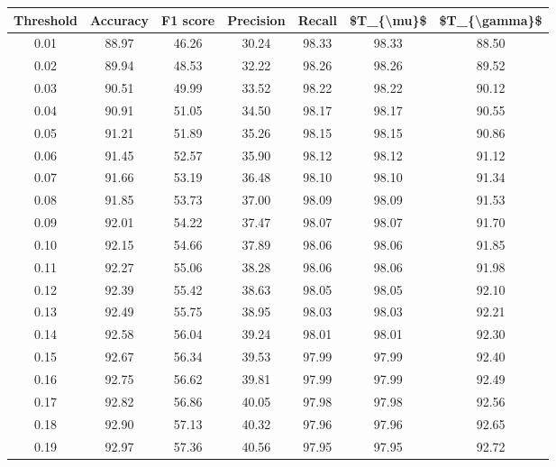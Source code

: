\begin{tabular}{|c|c|c|c|c|c|c|}
\hline
 Threshold &  Accuracy &  F1 score &  Precision &  Recall &  \$T\_\{\textbackslash mu\}\$ &  \$T\_\{\textbackslash gamma\}\$ \\
\hline
      0.01 &     88.97 &     46.26 &      30.24 &   98.33 &      98.33 &         88.50 \\
      0.02 &     89.94 &     48.53 &      32.22 &   98.26 &      98.26 &         89.52 \\
      0.03 &     90.51 &     49.99 &      33.52 &   98.22 &      98.22 &         90.12 \\
      0.04 &     90.91 &     51.05 &      34.50 &   98.17 &      98.17 &         90.55 \\
      0.05 &     91.21 &     51.89 &      35.26 &   98.15 &      98.15 &         90.86 \\
      0.06 &     91.45 &     52.57 &      35.90 &   98.12 &      98.12 &         91.12 \\
      0.07 &     91.66 &     53.19 &      36.48 &   98.10 &      98.10 &         91.34 \\
      0.08 &     91.85 &     53.73 &      37.00 &   98.09 &      98.09 &         91.53 \\
      0.09 &     92.01 &     54.22 &      37.47 &   98.07 &      98.07 &         91.70 \\
      0.10 &     92.15 &     54.66 &      37.89 &   98.06 &      98.06 &         91.85 \\
      0.11 &     92.27 &     55.06 &      38.28 &   98.06 &      98.06 &         91.98 \\
      0.12 &     92.39 &     55.42 &      38.63 &   98.05 &      98.05 &         92.10 \\
      0.13 &     92.49 &     55.75 &      38.95 &   98.03 &      98.03 &         92.21 \\
      0.14 &     92.58 &     56.04 &      39.24 &   98.01 &      98.01 &         92.30 \\
      0.15 &     92.67 &     56.34 &      39.53 &   97.99 &      97.99 &         92.40 \\
      0.16 &     92.75 &     56.62 &      39.81 &   97.99 &      97.99 &         92.49 \\
      0.17 &     92.82 &     56.86 &      40.05 &   97.98 &      97.98 &         92.56 \\
      0.18 &     92.90 &     57.13 &      40.32 &   97.96 &      97.96 &         92.65 \\
      0.19 &     92.97 &     57.36 &      40.56 &   97.95 &      97.95 &         92.72 \\

\end{tabular}
